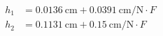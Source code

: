 \begin{align*}h_1 &= 0.0136~\text{cm} + 0.0391~\text{cm}/\text{N} \cdot F \\h_2 &= 0.1131~\text{cm} + 0.15~\text{cm}/\text{N} \cdot F \end{align*}